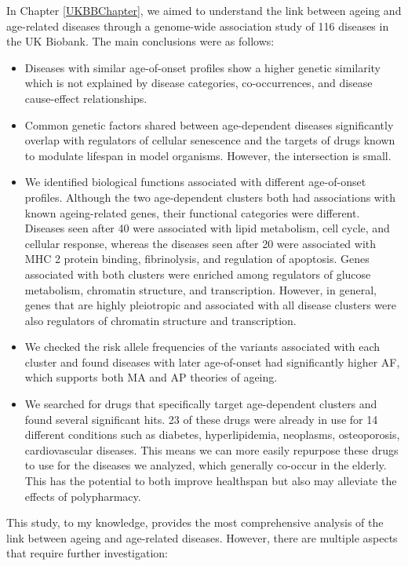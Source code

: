 \documentclass[12pt,twoside]{unicam}
\providecommand{\tightlist}{%
  \setlength{\itemsep}{0pt}\setlength{\parskip}{0pt}}
\begin{document}
In Chapter \ref{UKBBChapter}, we aimed to understand the link between ageing and age-related diseases through a genome-wide association study of 116 diseases in the UK Biobank. The main conclusions were as follows:

\begin{itemize}
\tightlist
\item
  Diseases with similar age-of-onset profiles show a higher genetic similarity which is not explained by disease categories, co-occurrences, and disease cause-effect relationships.
\item
  Common genetic factors shared between age-dependent diseases significantly overlap with regulators of cellular senescence and the targets of drugs known to modulate lifespan in model organisms. However, the intersection is small.
\item
  We identified biological functions associated with different age-of-onset profiles. Although the two age-dependent clusters both had associations with known ageing-related genes, their functional categories were different. Diseases seen after 40 were associated with lipid metabolism, cell cycle, and cellular response, whereas the diseases seen after 20 were associated with MHC 2 protein binding, fibrinolysis, and regulation of apoptosis. Genes associated with both clusters were enriched among regulators of glucose metabolism, chromatin structure, and transcription. However, in general, genes that are highly pleiotropic and associated with all disease clusters were also regulators of chromatin structure and transcription.
\item
  We checked the risk allele frequencies of the variants associated with each cluster and found diseases with later age-of-onset had significantly higher AF, which supports both MA and AP theories of ageing.
\item
  We searched for drugs that specifically target age-dependent clusters and found several significant hits. 23 of these drugs were already in use for 14 different conditions such as diabetes, hyperlipidemia, neoplasms, osteoporosis, cardiovascular diseases. This means we can more easily repurpose these drugs to use for the diseases we analyzed, which generally co-occur in the elderly. This has the potential to both improve healthspan but also may alleviate the effects of polypharmacy.
\end{itemize}

This study, to my knowledge, provides the most comprehensive analysis of the link between ageing and age-related diseases. However, there are multiple aspects that require further investigation:
\end{document}
